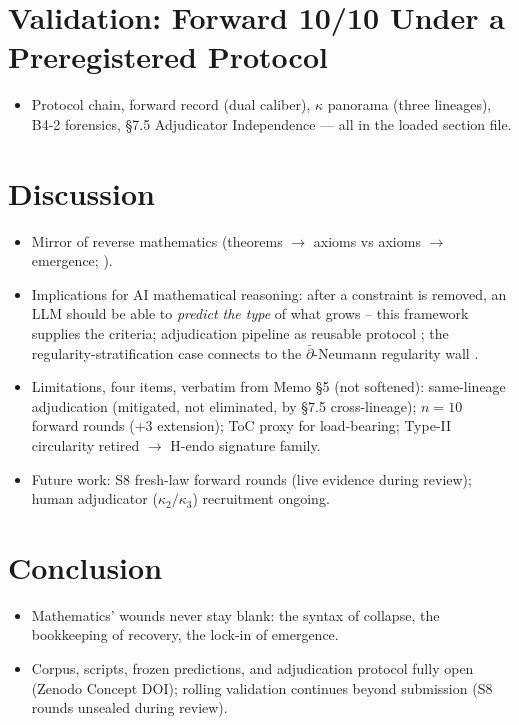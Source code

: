 \documentclass[11pt]{article}
\begin{document}
\section{Validation: Forward 10/10 Under a Preregistered Protocol}\label{sec:validation}
\begin{itemize}
  \item Protocol chain, forward record (dual caliber), $\kappa$
        panorama (three lineages), B4-2 forensics, §7.5 Adjudicator
        Independence --- all in the loaded section file.
\end{itemize}


\section{Discussion}\label{sec:discussion}
\begin{itemize}
  \item Mirror of reverse mathematics (theorems $\to$ axioms vs
        axioms $\to$ emergence; \citealp{simpson2009subsystems}).
  \item Implications for AI mathematical reasoning: after a constraint
        is removed, an LLM should be able to \emph{predict the type} of
        what grows -- this framework supplies the criteria; adjudication
        pipeline as reusable protocol \citep{wei2022chain, romera2024funsearch};
        the regularity-stratification case connects to the
        $\bar{\partial}$-Neumann regularity wall \citep{kohn1963harmonic}.
  \item Limitations, four items, verbatim from Memo §5 (not softened):
        same-lineage adjudication (mitigated, not eliminated, by §7.5
        cross-lineage); $n=10$ forward rounds (+3 extension);
        ToC proxy for load-bearing; Type-II circularity retired
        $\to$ H-endo signature family.
  \item Future work: S8 fresh-law forward rounds (live evidence during
        review); human adjudicator ($\kappa_2/\kappa_3$) recruitment
        ongoing.
\end{itemize}

\section{Conclusion}\label{sec:conclusion}
\begin{itemize}
  \item Mathematics' wounds never stay blank: the syntax of collapse,
        the bookkeeping of recovery, the lock-in of emergence.
  \item Corpus, scripts, frozen predictions, and adjudication protocol
        fully open (Zenodo Concept DOI); rolling validation continues
        beyond submission (S8 rounds unsealed during review).
\end{itemize}
\end{document}
